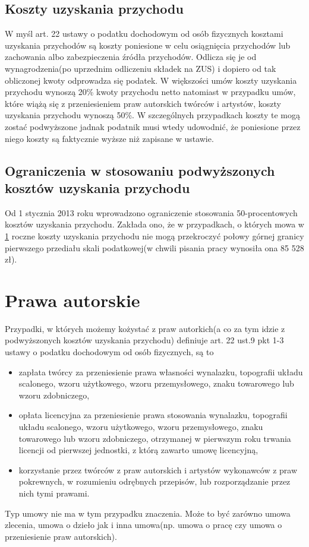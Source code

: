 \subsection[Koszty uzyskania przychodu][Koszty uzyskania przychodu]{Koszty uzyskania przychodu}
W myśl art. 22 ustawy o podatku dochodowym od osób fizycznych\cite{TODO} kosztami uzyskania przychodów są koszty poniesione w celu osiągnięcia przychodów lub zachowania albo zabezpieczenia źródła przychodów. Odlicza się je od wynagrodzenia(po uprzednim odliczeniu składek na ZUS) i dopiero od tak obliczonej kwoty odprowadza się podatek. W większości umów koszty uzyskania przychodu wynoszą 20\% kwoty przychodu netto natomiast w przypadku umów, które wiążą się z przeniesieniem praw autorskich twórców i artystów, koszty uzyskania przychodu wynoszą 50\%. W szczególnych przypadkach koszty te mogą zostać podwyższone jadnak podatnik musi wtedy udowodnić, że poniesione przez niego koszty są faktycznie wyższe niż zapisane w ustawie.

\subsection[Ograniczenia w stosowaniu podwyższonych kosztów uzyskania przychodu][Ograniczenia w stosowaniu podwyższonych kosztów uzyskania przychodu]{Ograniczenia w stosowaniu podwyższonych kosztów uzyskania przychodu}
Od 1 stycznia 2013 roku wprowadzono ograniczenie stosowania 50-procentowych kosztów uzyskania przychodu. Zakłada ono, że  w przypadkach, o których mowa w \ref{prawaAutorskie} roczne koszty uzyskania przychodu nie mogą przekroczyć połowy górnej granicy pierwszego przediału skali podatkowej(w chwili pisania pracy wynosiła ona 85 528 zł).

\section[Prawa autorskie][Prawa autorskie]{Prawa autorskie}
\label{prawaAutorskie}
Przypadki, w których możemy kożystać z praw autorkich(a co za tym idzie z podwyższonych kosztów uzyskania przychodu) definiuje art. 22 ust.9 pkt 1-3 ustawy o podatku dochodowym od osób fizycznych\cite{TODO}, są to
\begin{itemize}
	\item  zapłata twórcy za przeniesienie prawa własności wynalazku, topografii układu scalonego, wzoru użytkowego, wzoru przemysłowego, znaku towarowego lub wzoru zdobniczego,
	\item opłata licencyjna za przeniesienie prawa stosowania wynalazku, topografii układu scalonego, wzoru użytkowego, wzoru przemysłowego, znaku towarowego lub wzoru zdobniczego, otrzymanej w pierwszym roku trwania licencji od pierwszej jednostki, z którą zawarto umowę licencyjną,
	\item korzystanie przez twórców z praw autorskich i artystów wykonawców z praw pokrewnych, w rozumieniu odrębnych przepisów, lub rozporządzanie przez nich tymi prawami.
\end{itemize}
Typ umowy nie ma w tym przypadku znaczenia. Może to być zarówno umowa zlecenia, umowa o dzieło jak i inna umowa(np. umowa o pracę czy umowa o przeniesienie praw autorskich).

